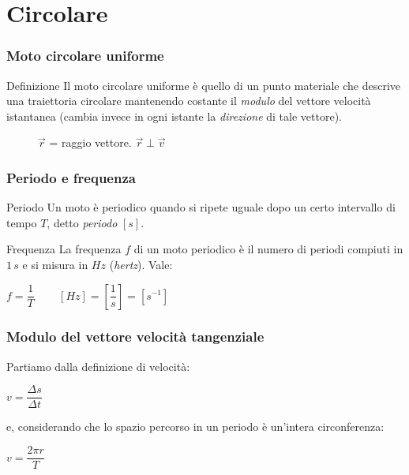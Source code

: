 \documentclass[]{beamer}
\theoremstyle{plain}
\begin{document}
\section{Circolare}

\begin{frame}
\frametitle{Moto circolare uniforme}
  \begin{block}{Definizione}
    Il moto circolare uniforme è quello di un punto materiale che descrive una traiettoria circolare mantenendo costante il \emph{modulo} del vettore velocità istantanea (cambia invece in ogni istante la \emph{direzione} di tale vettore).
  \end{block}
  
\begin{figure}

$ \vec{r} $ = raggio vettore. $ \vec{r}\perp\vec{v} $
\end{figure}
\end{frame}


\begin{frame}
\frametitle{Periodo e frequenza}
  \begin{block}{Periodo}
    Un moto è periodico quando si ripete uguale dopo un certo intervallo di tempo $ T $, detto \emph{periodo} $ [s] $.
  \end{block}\pause
  \begin{block}{Frequenza}
    La frequenza $ f $ di un moto periodico è il numero di periodi compiuti in $ 1 \, s $ e si misura in $ Hz $ (\emph{hertz}). Vale:
    \begin{center}
\colorbox{marroncino!30}{$ f = \dfrac{1}{T} $} ~~~ $  [Hz] = \left[ \dfrac{1}{s} \right] = \left[s^{-1}\right] $
\end{center}
  \end{block}

\end{frame}




\begin{frame}
  \frametitle{Modulo del vettore velocità tangenziale}
  Partiamo dalla definizione di velocità:
  \begin{center}
$ v = \dfrac{\Delta s}{\Delta t} $
  \end{center}\pause
  e, considerando che lo spazio percorso in un periodo è un'intera circonferenza:
  \begin{center}
\colorbox{marroncino!30}{$ v = \dfrac{2\pi r}{T} $}
  \end{center}
\end{frame}
\end{document}

